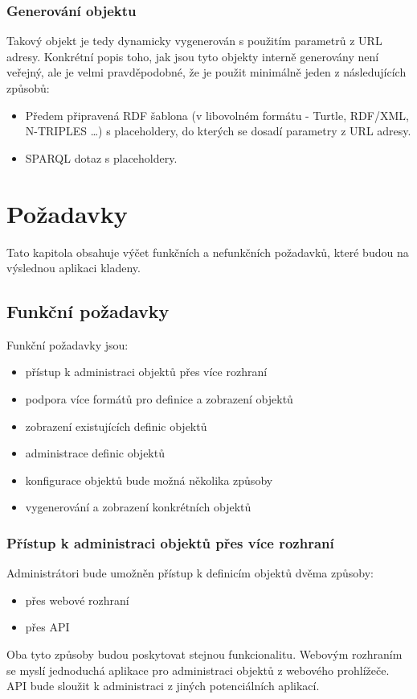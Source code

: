 \documentclass[thesis=B,czech]{FITthesis}[2012/06/26]
\begin{document}
\subsubsection{Generování objektu} Takový objekt je tedy dynamicky vygenerován s použitím parametrů z URL adresy. Konkrétní popis toho, jak jsou tyto objekty interně generovány 
není veřejný, ale je velmi pravděpodobné, že je použit minimálně jeden z následujících způsobů:
\begin{itemize}
  \item Předem připravená RDF šablona (v libovolném formátu - Turtle, RDF/XML, N-TRIPLES \ldots) s placeholdery, do kterých se dosadí parametry z URL adresy.
  \item SPARQL \cite{sparql_w3c}\cite{sparql_bob} dotaz s placeholdery.
 \end{itemize}

 

\section{Požadavky}
Tato kapitola obsahuje výčet funkčních a nefunkčních požadavků, které budou na výslednou aplikaci kladeny.

\subsection{Funkční požadavky}
Funkční požadavky jsou:
 \begin{itemize}
  \item přístup k administraci objektů přes více rozhraní
  \item podpora více formátů pro definice a zobrazení objektů
  \item zobrazení existujících definic objektů
  \item administrace definic objektů  
  \item konfigurace objektů bude možná několika způsoby
  \item vygenerování a zobrazení konkrétních objektů
 \end{itemize}
 
 \subsubsection{Přístup k administraci objektů přes více rozhraní}
 Administrátori bude umožněn přístup k definicím objektů dvěma způsoby:
 \begin{itemize}
    \item přes webové rozhraní
    \item přes API
 \end{itemize}
 Oba tyto způsoby budou poskytovat stejnou funkcionalitu. Webovým rozhraním se myslí jednoduchá aplikace pro administraci objektů z webového prohlížeče.
 API bude sloužit k administraci z jiných potenciálních aplikací.
 
\end{document}
